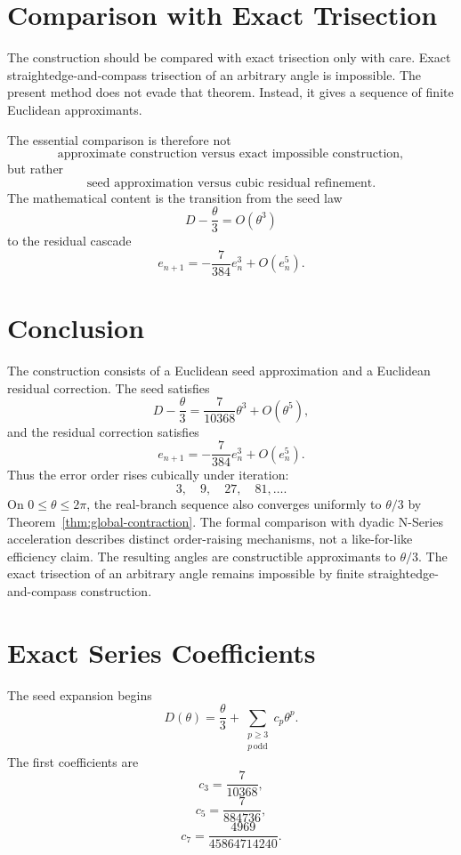 \documentclass[11pt]{article}
\theoremstyle{remark}
\begin{document}
\section{Comparison with Exact Trisection}

The construction should be compared with exact trisection only with care.  Exact
straightedge-and-compass trisection of an arbitrary angle is impossible.  The present
method does not evade that theorem.  Instead, it gives a sequence of finite Euclidean
approximants.

The essential comparison is therefore not
\[
\text{approximate construction versus exact impossible construction},
\]
but rather
\[
\text{seed approximation versus cubic residual refinement}.
\]
The mathematical content is the transition from the seed law
\[
D-\frac{\theta}{3}=O(\theta^3)
\]
to the residual cascade
\[
e_{n+1}
=
-\frac{7}{384}e_n^3+O(e_n^5).
\]

\section{Conclusion}

The construction consists of a Euclidean seed approximation and a Euclidean residual
correction.  The seed satisfies
\[
D-\frac{\theta}{3}
=
\frac{7}{10368}\theta^3+O(\theta^5),
\]
and the residual correction satisfies
\[
e_{n+1}
=
-\frac{7}{384}e_n^3+O(e_n^5).
\]
Thus the error order rises cubically under iteration:
\[
3,\quad 9,\quad 27,\quad 81,
\ldots .
\]
On $0\le\theta\le2\pi$, the real-branch sequence also converges uniformly to $\theta/3$ by Theorem~\ref{thm:global-contraction}. The formal comparison with dyadic N-Series acceleration describes distinct order-raising mechanisms, not a like-for-like efficiency claim. The resulting angles are constructible approximants to $\theta/3$.  The exact trisection
of an arbitrary angle remains impossible by finite straightedge-and-compass construction.

\appendix

\section{Exact Series Coefficients}

The seed expansion begins
\[
D(\theta)
=
\frac{\theta}{3}
+
\sum_{\substack{p\ge 3\\ p\,\mathrm{odd}}}c_p\theta^p.
\]
The first coefficients are
\[
c_3=\frac{7}{10368},
\]
\[
c_5=\frac{7}{884736},
\]
\[
c_7=\frac{4969}{45864714240}.
\]
\end{document}
